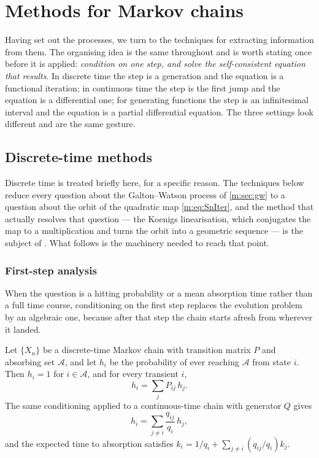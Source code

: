 \section{Methods for Markov chains}
\label{m:sec:methods}

Having set out the processes, we turn to the techniques for extracting information
from them. The organising idea is the same throughout and is worth stating once
before it is applied: \emph{condition on one step, and solve the self-consistent
equation that results}. In discrete time the step is a generation and the equation
is a functional iteration; in continuous time the step is the first jump and the
equation is a differential one; for generating functions the step is an
infinitesimal interval and the equation is a partial differential equation. The
three settings look different and are the same gesture.

\subsection{Discrete-time methods}
\label{m:sec:dtmethods}

Discrete time is treated briefly here, for a specific reason. The techniques below
reduce every question about the Galton--Watson process of \cref{m:sec:gw} to a
question about the orbit of the quadratic map \cref{m:eq:SnIter}, and the method
that actually resolves that question --- the Koenigs linearisation, which
conjugates the map to a multiplication and turns the orbit into a geometric
sequence --- is the subject of \ChA. What follows is the machinery needed to reach
that point.

\subsubsection{First-step analysis}
\label{m:sec:firststep}

When the question is a hitting probability or a mean absorption time rather than a
full time course, conditioning on the first step replaces the evolution problem by
an algebraic one, because after that step the chain starts afresh from wherever it
landed.

\begin{proposition}
\label{m:prop:firststep}
Let $\{X_n\}$ be a discrete-time Markov chain with transition matrix $P$ and
absorbing set $\mathcal A$, and let $h_i$ be the probability of ever reaching
$\mathcal A$ from state $i$. Then $h_i=1$ for $i\in\mathcal A$, and for every
transient $i$,
\begin{equation}
\label{m:eq:firststepdiscrete}
h_i = \sum_{j}P_{ij}\,h_j .
\end{equation}
The same conditioning applied to a continuous-time chain with generator $Q$ gives
\begin{equation}
\label{m:eq:firststep}
h_i = \sum_{j\neq i}\frac{q_{ij}}{q_i}\,h_j ,
\end{equation}
and the expected time to absorption satisfies
$k_i = 1/q_i + \sum_{j\neq i}(q_{ij}/q_i)k_j$.
\end{proposition}

